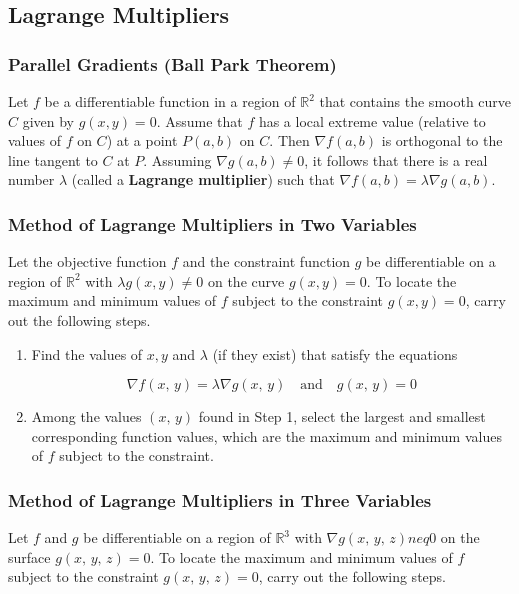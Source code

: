 \subsection{Lagrange Multipliers}
\subsubsection{Parallel Gradients (Ball Park Theorem)}
Let $f$ be a differentiable function in a region of $\mathbb{R}^2$ that contains the smooth curve $C$ given by $g(x, y) = 0$. Assume that $f$ has a local extreme value (relative to values of $f$ on $C$) at a point $P(a, b)$ on $C$. Then $\nabla f(a, b)$ is orthogonal to the line tangent to $C$ at $P$. Assuming $\nabla g(a, b) \neq 0$, it follows that there is a real number $\lambda$ (called a \textbf{Lagrange multiplier}) such that $\nabla f(a, b) = \lambda \nabla g(a, b)$.

\subsubsection{Method of Lagrange Multipliers in Two Variables}
Let the objective function $f$ and the constraint function $g$ be differentiable on a region of $\mathbb{R}^2$ with $\lambda g(x, y) \neq 0$ on the curve $g(x, y) = 0$. To locate the maximum and minimum values of $f$ subject to the constraint $g(x, y) = 0$, carry out the following steps.

\begin{enumerate}
    \item Find the values of $x, y$ and $\lambda$ (if they exist) that satisfy the equations

    \begin{equation}
        \nabla f(x,\, y) = \lambda \nabla g(x,\, y) \quad \text{and} \quad g(x,\, y) = 0
    \end{equation}

    \item Among the values $(x,\, y)$ found in Step 1, select the largest and smallest corresponding function values, which are the maximum and minimum values of $f$ subject to the constraint.
\end{enumerate}

\subsubsection{Method of Lagrange Multipliers in Three Variables}
Let $f$ and $g$ be differentiable on a region of $\mathbb{R}^3$ with $\nabla g(x,\, y,\, z) neq 0$ on the surface $g(x,\, y,\, z) = 0$. To locate the maximum and minimum values of $f$ subject to the constraint $g(x,\, y,\, z) = 0$, carry out the following steps.

